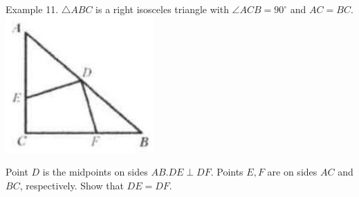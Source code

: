 \documentclass[10pt]{article}
\begin{document}
Example 11. \(\triangle A B C\) is a right isosceles triangle with \(\angle A C B=90^{\circ}\) and \(A C=B C\).\\
\includegraphics[max width=\textwidth, center]{2025_04_17_97bc1f7e44d93c271a88g-012(3)}

Point \(D\) is the midpoints on sides \(A B . D E \perp D F\). Points \(E, F\) are on sides \(A C\) and \(B C\), respectively. Show that \(D E=D F\).
\end{document}
